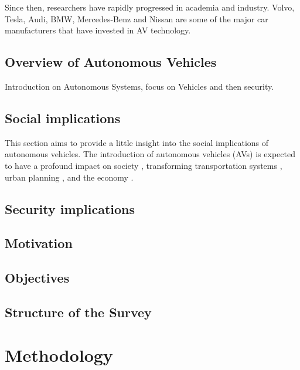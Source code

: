 \documentclass{scrartcl}
\begin{document}
    Since then, researchers have rapidly progressed in academia and industry.
    Volvo, Tesla, Audi, BMW,
    Mercedes-Benz and Nissan are some of the major car manufacturers that have invested in AV technology.

    \cite{faisal2019understanding}

    \subsection{Overview of Autonomous Vehicles}\label{subsec:overview-of-autonomous-vehicles}
    Introduction on Autonomous Systems, focus on Vehicles and then security.

    \subsection{Social implications}\label{subsec:social-implications}

    This section aims to provide a little insight into the social implications of autonomous vehicles.
    The introduction of autonomous vehicles (AVs) is expected to have a profound impact on society \cite{thomas2020perception}, transforming transportation systems \cite{intelligent_transportation_2023}
    , urban planning \cite{impact_autonomous_vehicles_2018}, and the economy \cite{economic_aspects_2020}.

    \subsection{Security implications}\label{subsec:security-implications}

    \subsection{Motivation}\label{subsec:motivation-for-the-study}

    \subsection{Objectives}\label{subsec:research-objectives}

    \subsection{Structure of the Survey}\label{subsec:structure-of-the-survey}

    \section{Methodology}\label{sec:methodology}
\end{document}
